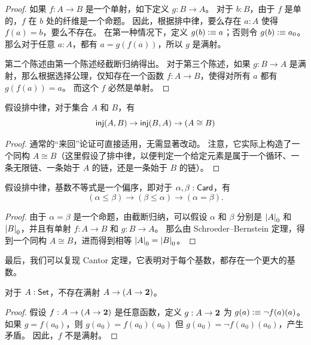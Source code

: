 \begin{proof}
  如果 $f:A\to B$ 是一个单射，如下定义 $g:B\to A$。
  对于 $b:B$，由于 $f$ 是单的，$f$ 在 $b$ 处的纤维是一个命题。
  因此，根据排中律，要么存在 $a:A$ 使得 $f(a)=b$，要么不存在。
  在第一种情况下，定义 $g(b)\vcentcolon\equiv a$；否则令 $g(b)\vcentcolon\equiv a_0$。
  那么对于任意 $a:A$，都有 $a = g(f(a))$，所以 $g$ 是满射。

  第二个陈述由第一个陈述经截断归纳得出。
  对于第三个陈述，如果 $g:B\to A$ 是满射，那么根据选择公理，仅知存在一个函数 $f:A\to B$，使得对所有 $a$ 都有 $g(f(a)) = a$。
  而这个 $f$ 必然是单射。
\end{proof}

\begin{thm}
  假设排中律，对于集合 $A$ 和 $B$，有
  \[ \mathsf{inj}(A,B) \to \mathsf{inj}(B,A) \to (A\cong B) \]
\end{thm}

\begin{proof}
  通常的``来回''论证可直接适用，无需显著改动。
  注意，它实际上构造了一个同构 $A\cong B$（这里假设了排中律，以便判定一个给定元素是属于一个循环、一条无限链、一条始于 $A$ 的链，还是一条始于 $B$ 的链）。
\end{proof}

\begin{cor}
  假设排中律，基数不等式是一个偏序，即对于 $\alpha,\beta:\mathsf{Card}$，有
  \[ (\alpha\le\beta) \to (\beta\le\alpha) \to (\alpha=\beta). \]
\end{cor}

\begin{proof}
  由于 $\alpha=\beta$ 是一个命题，由截断归纳，可以假设 $\alpha$ 和 $\beta$ 分别是 $\mathopen{}\left|A\right|_{0}^{}\mathclose{}$ 和 $\mathopen{}\left|B\right|_{0}^{}\mathclose{}$，并且有单射 $f:A\to B$ 和 $g:B\to A$。
  那么由 Schroeder--Bernstein 定理，得到一个同构 $A\cong B$，进而得到相等 $\mathopen{}\left|A\right|_{0}^{}\mathclose{}=\mathopen{}\left|B\right|_{0}^{}\mathclose{}$。
\end{proof}

最后，我们可以复现 Cantor 定理，它表明对于每个基数，都存在一个更大的基数。

\begin{thm}[Cantor]
  对于 $A:\mathsf{Set}$，不存在满射 $A \to (A\to \mathbf{2})$。
\end{thm}

\begin{proof}
  假设 $f:A \to (A\to \mathbf{2})$ 是任意函数，定义 $g:A\to \mathbf{2}$ 为 $g(a) \vcentcolon\equiv \neg f(a)(a)$。
  如果 $g = f(a_0)$，则 $g(a_0) = f(a_0)(a_0)$ 但 $g(a_0) = \neg f(a_0)(a_0)$，产生矛盾。
  因此，$f$ 不是满射。
\end{proof}


